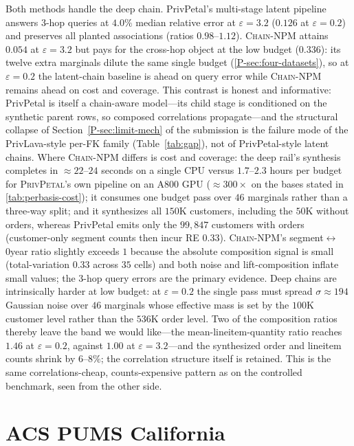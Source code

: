 \documentclass[sigconf, nonacm]{acmart}
\newcommand{\chainnpm}{\textsc{Chain-NPM}\xspace}
\newcommand{\privpetal}{\textsc{PrivPetal}\xspace}
\newcommand{\pref}[1]{\ref{P-#1}}
\newcommand{\psec}[1]{Section~\ref{P-sec:#1} of the submission}
\begin{document}
Both methods handle the deep chain. PrivPetal's multi-stage latent
pipeline answers 3-hop queries at $4.0\%$ median relative error at
$\varepsilon{=}3.2$ ($0.126$ at $\varepsilon{=}0.2$) and preserves all
planted associations (ratios $0.98$--$1.12$). \chainnpm attains $0.054$ at
$\varepsilon{=}3.2$ but pays for the cross-hop object at the low budget
($0.336$): its twelve extra marginals dilute the same single budget
(\pref{sec:four-datasets}), so at $\varepsilon{=}0.2$ the latent-chain
baseline is ahead on query error while \chainnpm remains ahead on cost and
coverage. This contrast is honest and informative:
PrivPetal is itself a chain-aware model---its child stage is conditioned
on the synthetic parent rows, so composed correlations propagate---and the
structural collapse of \psec{limit-mech} is the failure mode of the
PrivLava-style per-FK family (Table~\ref{tab:gap}), not of
PrivPetal-style
latent chains. Where \chainnpm differs is cost and coverage: the deep rail's
synthesis completes in $\approx 22$--$24$ seconds on a single CPU versus
$1.7$--$2.3$ hours per budget for \privpetal{}'s own pipeline on an A800 GPU
($\approx 300\times$ on the bases stated in \ref{tab:perbasis-cost}); it
consumes one
budget pass over $46$ marginals rather than a three-way split; and it
synthesizes all $150$K customers, including the $50$K without orders,
whereas PrivPetal emits only the $99{,}847$ customers with orders
(customer-only segment counts then incur RE $0.33$).
\chainnpm's segment$\leftrightarrow$\penalty0year ratio slightly exceeds $1$
because the absolute composition signal is small (total-variation $0.33$
across $35$ cells) and both noise and lift-composition inflate small
values; the 3-hop query errors are the primary evidence. Deep chains are
intrinsically harder at low budget: at $\varepsilon{=}0.2$ the single pass
must spread $\sigma \approx 194$ Gaussian noise over $46$ marginals whose
effective mass is set by the $100$K customer level rather than the $536$K
order level. Two of the composition ratios thereby leave the band we would
like---the mean-lineitem-quantity ratio reaches $1.46$ at
$\varepsilon{=}0.2$, against $1.00$ at $\varepsilon{=}3.2$---and the
synthesized order and lineitem counts shrink by $6$--$8\%$; the correlation
structure itself is retained. This is the same correlations-cheap,
counts-expensive pattern as on the controlled benchmark, seen from the other
side.

\section{ACS PUMS California}
\label{app:acs-rail}
\end{document}

